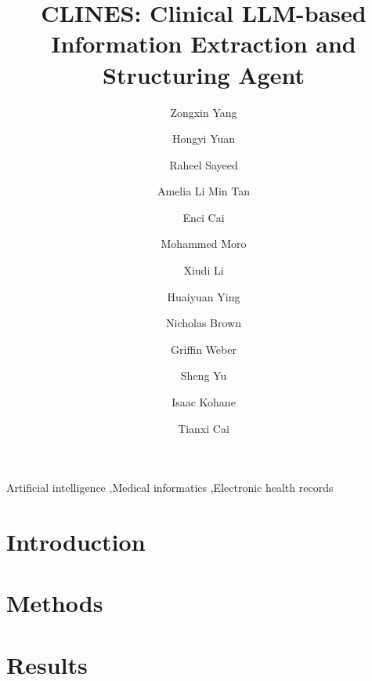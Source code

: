 \documentclass[12pt,nopreprintline]{elsarticle}
\begin{document}
\begin{frontmatter}

\title{CLINES: Clinical LLM-based Information Extraction and Structuring Agent}

\author[1]{Zongxin Yang}
\author[3]{Hongyi Yuan}
\author[1]{Raheel Sayeed}
\author[1]{Amelia Li Min Tan}
\author[1]{Enci Cai}
\author[1]{Mohammed Moro}
\author[4]{Xiudi Li}
\author[3]{Huaiyuan Ying}
\author[6]{Nicholas Brown}
\author[5,6]{Griffin Weber}
\author[3]{Sheng Yu}
\author[1]{Isaac Kohane}
\author[1,2]{Tianxi Cai}

\address[1]{Department of Biomedical Informatics, Harvard Medical School, Boston, MA, USA}
\address[2]{Harvard T.H. Chan School of Public Health, Boston, MA, USA}
\address[3]{Department of Statistics and Data Science, Tsinghua University, Beijing, China}
\address[4]{Division of Biostatistics, University of California Berkeley, Berkeley, CA, USA}
\address[5]{Division of Interdisciplinary Medicine and Biotechnology, Department of Medicine, Beth Israel Deaconess Medical Center, Boston, MA, USA}
\address[6]{Harvard Medical School, Boston, MA, USA}


\begin{abstract}

\end{abstract}

\begin{keyword}
Artificial intelligence \sep Medical informatics \sep Electronic health records
\end{keyword}

\end{frontmatter}



\section{Introduction}


\section{Methods}


\section{Results}

\end{document}

